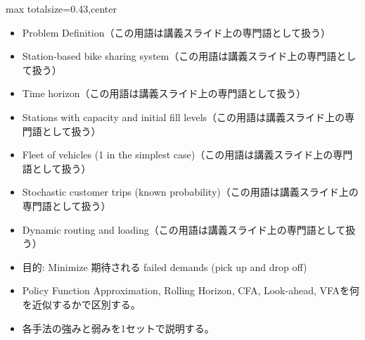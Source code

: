 \clearpage
{}
\begin{minipage}[t]{0.405\textwidth}
\begin{adjustbox}{max totalsize={\textwidth}{0.43\textheight},center}
\begin{minipage}{\textwidth}\scriptsize
{}\begin{itemize}
\item Problem Definition（この用語は講義スライド上の専門語として扱う）
\item Station-based bike sharing system（この用語は講義スライド上の専門語として扱う）
\item Time horizon（この用語は講義スライド上の専門語として扱う）
\item Stations with capacity and initial fill levels（この用語は講義スライド上の専門語として扱う）
\item Fleet of vehicles (1 in the simplest case)（この用語は講義スライド上の専門語として扱う）
\item Stochastic customer trips (known probability)（この用語は講義スライド上の専門語として扱う）
\item Dynamic routing and loading（この用語は講義スライド上の専門語として扱う）
\item 目的: Minimize 期待される failed demands (pick up and drop off)
\end{itemize}\begin{itemize}
\item Policy Function Approximation, Rolling Horizon, CFA, Look-ahead, VFAを何を近似するかで区別する。
\item 各手法の強みと弱みを1セットで説明する。
\end{itemize}
\end{minipage}
\end{adjustbox}
\end{minipage}\hfill
